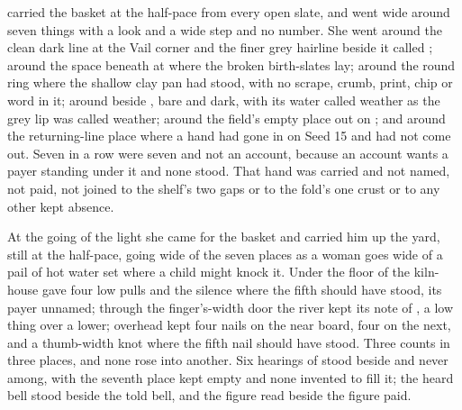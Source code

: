  carried the basket at the half-pace from every open slate, and went wide around seven things with a look and a wide step and no number. She went around the clean dark line at the Vail corner and the finer grey hairline beside it called ; around the space beneath  at  where the broken birth-slates lay; around the round ring where the shallow clay pan had stood, with no scrape, crumb, print, chip or word in it; around  beside , bare and dark, with its water called weather as the grey lip was called weather; around the field's empty place out on ; and around the returning-line place where a hand had gone in on Seed 15 and had not come out. Seven in a row were seven and not an account, because an account wants a payer standing under it and none stood. That hand was carried and not named, not paid, not joined to the shelf's two gaps or to the fold's one crust or to any other kept absence.

\scenebreak

At the going of the light she came for the basket and carried him up the yard, still at the half-pace, going wide of the seven places as a woman goes wide of a pail of hot water set where a child might knock it. Under the floor of the kiln-house  gave four low pulls and the silence where the fifth should have stood, its payer unnamed; through the finger's-width door the river kept its note of , a low thing over a lower; overhead  kept four nails on the near board, four on the next, and a thumb-width knot where the fifth nail should have stood. Three counts in three places, and none rose into another. Six hearings of  stood beside and never among, with the seventh place kept empty and none invented to fill it; the heard bell stood beside the told bell, and the figure read beside the figure paid.

